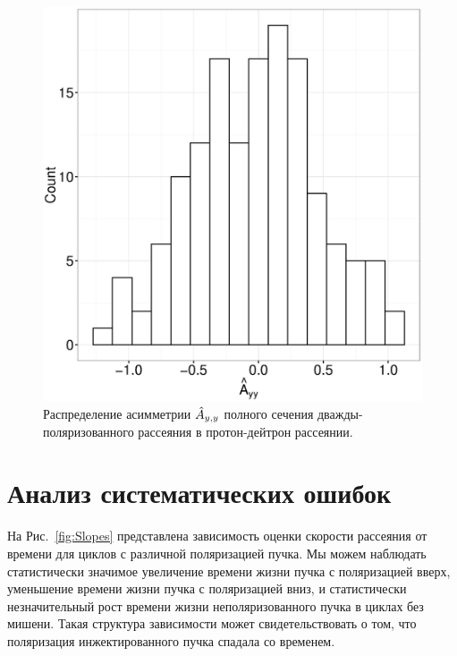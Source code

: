 \documentclass{article}
\begin{document}
	\begin{figure}[h]
		\centering
		\includegraphics[scale=.8]{img/Ayy_dens.eps}
		\caption{Распределение асимметрии $\Ayy*$ полного сечения дважды-поляризованного рассеяния в протон-дейтрон рассеянии.\label{fig:AyyDensity}}
	\end{figure}
	
	\section{Анализ систематических ошибок}
	На Рис.~\ref{fig:Slopes} представлена зависимость оценки скорости рассеяния от времени для циклов с различной поляризацией пучка. Мы можем наблюдать статистически значимое увеличение времени жизни пучка с поляризацией вверх, уменьшение времени жизни пучка с поляризацией вниз, и статистически незначительный рост времени жизни неполяризованного пучка в циклах без мишени. Такая структура зависимости может свидетельствовать о том, что поляризация инжектированного пучка спадала со временем. 
	
\end{document}
